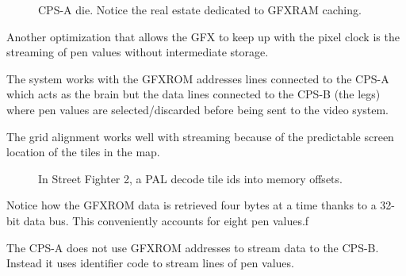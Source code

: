  \begin{figure}[H]%
 \caption*{CPS-A die. Notice the real estate dedicated to GFXRAM caching.}%
 \end{figure}%



Another optimization that allows the GFX to keep up with the pixel clock is the streaming of pen values without intermediate storage. 

The system works with the GFXROM addresses lines connected to the CPS-A which acts as the brain but the data lines  connected to the CPS-B (the legs) where pen values are selected/discarded before being sent to the video system.

The grid alignment works well with streaming because of the predictable screen location of the tiles in the map.

 \begin{figure}[H]%
 \caption*{In Street Fighter 2, a PAL  decode tile ids into memory offsets.}%
 \end{figure}%

Notice how the GFXROM data is retrieved four bytes at a time thanks to a 32-bit data bus. This conveniently accounts for eight pen values.f

The CPS-A does not use GFXROM addresses to stream data to the CPS-B. Instead it uses identifier code to stream lines of pen values. 






